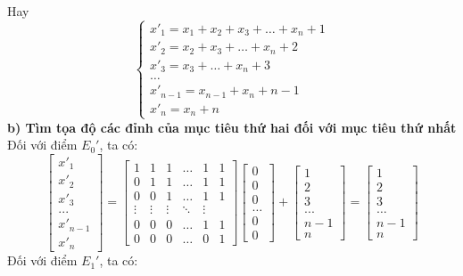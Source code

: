 \documentclass[12pt,a4paper]{article}
\begin{document}
Hay \[ \begin{cases} x'_1 = x_1 + x_2 + x_3 + \dots + x_n + 1 \\ x'_2 = x_2 + x_3 + \dots + x_n + 2 \\ x'_3 = x_3 + \dots + x_n + 3 \\ \dots \\ x'_{n-1}=x_{n-1}+x_n+n-1 \\ x'_n = x_n + n \end{cases} \]
\textbf{b) Tìm tọa độ các đỉnh của mục tiêu thứ hai đối với mục tiêu thứ nhất } \\[4pt]
Đối với điểm \(E_0'\), ta có: 
\[
\begin{bmatrix}
    x'_1 \\ x'_2 \\ x'_3 \\ ... \\ x'_{n-1} \\ x'_n
\end{bmatrix} = \begin{bmatrix}
1 & 1 & 1 & \dots & 1 & 1 \\
0 & 1 & 1 & \dots & 1 & 1 \\
0 & 0 & 1 & \dots & 1 & 1 \\
\vdots & \vdots & \vdots & \ddots & \vdots \\
0 & 0 & 0 & \dots & 1 & 1 \\
0 & 0 & 0 & \dots & 0 & 1
\end{bmatrix} \begin{bmatrix}
    0 \\ 0 \\ 0 \\ \dots \\ 0 \\ 0
\end{bmatrix} + \begin{bmatrix}
    1 \\ 2 \\ 3 \\ ... \\ n-1 \\ n
\end{bmatrix} = \begin{bmatrix}
    1 \\ 2 \\ 3 \\ \dots \\ n-1 \\ n
\end{bmatrix}
\]
Đối với điểm \(E_1'\), ta có: 
\end{document}
